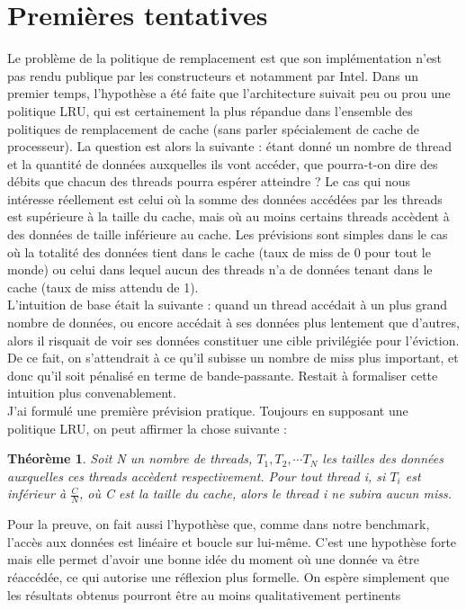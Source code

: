 \documentclass{report}
\begin{document}
\section{Premières tentatives}
Le problème de la politique de remplacement est que son implémentation n'est pas rendu publique
par les constructeurs et notamment par Intel. Dans un premier temps, l'hypothèse a été faite
que l'architecture suivait peu ou prou une politique LRU, qui est certainement la plus répandue
dans l'ensemble des politiques de remplacement de cache (sans parler spécialement de cache 
de processeur). La question est alors la suivante : étant donné un nombre de thread et la 
quantité de données auxquelles ils vont accéder, que pourra-t-on dire des débits que chacun 
des threads pourra espérer atteindre ? Le cas qui nous intéresse réellement est celui où
la somme des données accédées par les threads est supérieure à la taille du cache, mais où
au moins certains threads accèdent à des données de taille inférieure au cache. Les prévisions
sont simples dans le cas où la totalité des données tient dans le cache (taux de miss de 0 
pour tout le monde) ou celui dans lequel aucun des threads n'a de données tenant dans le
cache (taux de miss attendu de 1).
\\L'intuition de base était la suivante : quand un thread accédait à un plus grand nombre de
données, ou encore accédait à ses données plus lentement que d'autres, alors il risquait
de voir ses données constituer une cible privilégiée pour l'éviction. De ce fait, on s'attendrait
à ce qu'il subisse un nombre de miss plus important, et donc qu'il soit pénalisé en terme de
bande-passante. Restait à formaliser cette intuition plus convenablement.
\\J'ai formulé une première prévision pratique. Toujours en supposant une politique LRU, on
peut affirmer la chose suivante : 
\newtheorem{th1}{Théorème}
\newtheorem{th2}{Théorème}
\begin{th1}
Soit N un nombre de threads, $T_1, T_2, \cdots T_N$ les tailles des données auxquelles ces threads
accèdent respectivement. Pour tout thread i, si $T_i$ est inférieur à $\frac{C}{N}$, où C est la 
taille du cache, alors le thread i ne subira aucun miss.
\end{th1}
Pour la preuve, on fait aussi l'hypothèse que, comme dans notre benchmark, l'accès aux données
est linéaire et boucle sur lui-même. C'est une hypothèse forte mais elle permet d'avoir une 
bonne idée du moment où une donnée va être réaccédée, ce qui autorise une réflexion plus formelle.
On espère simplement que les résultats obtenus pourront être au moins qualitativement pertinents
\end{document}
